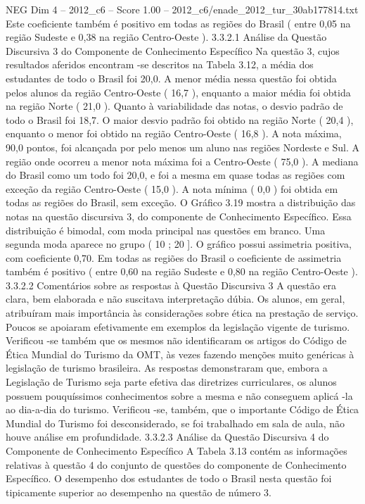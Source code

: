 \begin{textsample}{NEG Dim 4 – 2012\_c6 – Score 1.00 – 2012\_c6/enade\_2012\_tur\_30ab177814.txt}
Este coeficiente também é positivo em todas as regiões do Brasil ( entre 0,05 na região Sudeste e 0,38 na região Centro-Oeste ). 3.3.2.1 Análise da Questão Discursiva 3 do Componente de Conhecimento Específico Na questão 3, cujos resultados aferidos encontram -se descritos na Tabela 3.12, a média dos estudantes de todo o Brasil foi 20,0.
A menor média nessa questão foi obtida pelos alunos da região Centro-Oeste ( 16,7 ), enquanto a maior média foi obtida na região Norte ( 21,0 ).
Quanto à variabilidade das notas, o desvio padrão de todo o Brasil foi 18,7.
O maior desvio padrão foi obtido na região Norte ( 20,4 ), enquanto o menor foi obtido na região Centro-Oeste ( 16,8 ).
A nota máxima, 90,0 pontos, foi alcançada por pelo menos um aluno nas regiões Nordeste e Sul.
A região onde ocorreu a menor nota máxima foi a Centro-Oeste ( 75,0 ).
A mediana do Brasil como um todo foi 20,0, e foi a mesma em quase todas as regiões com exceção da região Centro-Oeste ( 15,0 ).
A nota mínima ( 0,0 ) foi obtida em todas as regiões do Brasil, sem exceção.
O Gráfico 3.19 mostra a distribuição das notas na questão discursiva 3, do componente de Conhecimento Específico.
Essa distribuição é bimodal, com moda principal nas questões em branco.
Uma segunda moda aparece no grupo ( 10 ; 20 ].
O gráfico possui assimetria positiva, com coeficiente 0,70.
Em todas as regiões do Brasil o coeficiente de assimetria também é positivo ( entre 0,60 na região Sudeste e 0,80 na região Centro-Oeste ). 3.3.2.2 Comentários sobre as respostas à Questão Discursiva 3 A questão era clara, bem elaborada e não suscitava interpretação dúbia.
Os alunos, em geral, atribuíram mais importância às considerações sobre ética na prestação de serviço.
Poucos se apoiaram efetivamente em exemplos da legislação vigente de turismo.
Verificou -se também que os mesmos não identificaram os artigos do Código de Ética Mundial do Turismo da OMT, às vezes fazendo menções muito genéricas à legislação de turismo brasileira.
As respostas demonstraram que, embora a Legislação de Turismo seja parte efetiva das diretrizes curriculares, os alunos possuem pouquíssimos conhecimentos sobre a mesma e não conseguem aplicá -la ao dia-a-dia do turismo.
Verificou -se, também, que o importante Código de Ética Mundial do Turismo foi desconsiderado, se foi trabalhado em sala de aula, não houve análise em profundidade. 3.3.2.3 Análise da Questão Discursiva 4 do Componente de Conhecimento Específico A Tabela 3.13 contém as informações relativas à questão 4 do conjunto de questões do componente de Conhecimento Específico.
O desempenho dos estudantes de todo o Brasil nesta questão foi tipicamente superior ao desempenho na questão de número 3.

\end{textsample}
